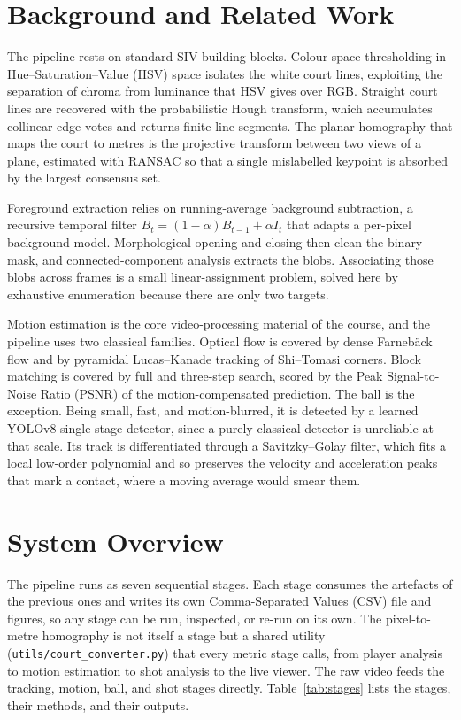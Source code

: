 \documentclass[11pt]{article}
\begin{document}
\section{Background and Related Work}
The pipeline rests on standard SIV building blocks. Colour-space thresholding in Hue--Saturation--Value (HSV) space isolates the white court lines, exploiting the separation of chroma from luminance that HSV gives over RGB. Straight court lines are recovered with the probabilistic Hough transform, which accumulates collinear edge votes and returns finite line segments. The planar homography that maps the court to metres is the projective transform between two views of a plane, estimated with RANSAC so that a single mislabelled keypoint is absorbed by the largest consensus set.

Foreground extraction relies on running-average background subtraction, a recursive temporal filter $B_t = (1-\alpha)B_{t-1} + \alpha I_t$ that adapts a per-pixel background model. Morphological opening and closing then clean the binary mask, and connected-component analysis extracts the blobs. Associating those blobs across frames is a small linear-assignment problem, solved here by exhaustive enumeration because there are only two targets.

Motion estimation is the core video-processing material of the course, and the pipeline uses two classical families. Optical flow is covered by dense Farneb\"ack flow and by pyramidal Lucas--Kanade tracking of Shi--Tomasi corners. Block matching is covered by full and three-step search, scored by the Peak Signal-to-Noise Ratio (PSNR) of the motion-compensated prediction. The ball is the exception. Being small, fast, and motion-blurred, it is detected by a learned YOLOv8 single-stage detector, since a purely classical detector is unreliable at that scale. Its track is differentiated through a Savitzky--Golay filter, which fits a local low-order polynomial and so preserves the velocity and acceleration peaks that mark a contact, where a moving average would smear them.

\section{System Overview}
The pipeline runs as seven sequential stages. Each stage consumes the artefacts of the previous ones and writes its own Comma-Separated Values (CSV) file and figures, so any stage can be run, inspected, or re-run on its own. The pixel-to-metre homography is not itself a stage but a shared utility (\texttt{utils/court\_converter.py}) that every metric stage calls, from player analysis to motion estimation to shot analysis to the live viewer. The raw video feeds the tracking, motion, ball, and shot stages directly. Table~\ref{tab:stages} lists the stages, their methods, and their outputs.
\end{document}
